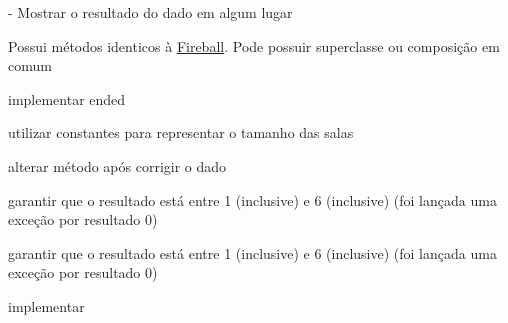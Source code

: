 \begin{DoxyRefList}
-\/ Mostrar o resultado do dado em algum lugar  
\item[Classe \mbox{\hyperlink{classbr_1_1unicamp_1_1mc322_1_1projeto_1_1heroquest_1_1magic_1_1_magic_missile}{br.unicamp.mc322.projeto.heroquest.magic.Magic\+Missile}} ]\label{todo__todo000063}%
%
Possui métodos identicos à \mbox{\hyperlink{classbr_1_1unicamp_1_1mc322_1_1projeto_1_1heroquest_1_1magic_1_1_fireball}{Fireball}}. Pode possuir superclasse ou composição em comum  
\item[Classe \mbox{\hyperlink{classbr_1_1unicamp_1_1mc322_1_1projeto_1_1heroquest_1_1service_1_1_hero_quest_stage_creator_service}{br.unicamp.mc322.projeto.heroquest.service.Hero\+Quest\+Stage\+Creator\+Service}} ]\label{todo__todo000064}%
%
implementar ended  
\item[Membro \mbox{\hyperlink{classbr_1_1unicamp_1_1mc322_1_1projeto_1_1heroquest_1_1service_1_1_hero_quest_stage_creator_service_a0c08c114512c97cbe75cc9a026592bd2}{br.unicamp.mc322.projeto.heroquest.service.Hero\+Quest\+Stage\+Creator\+Service.add\+Wall}} (Stage\+Prototype stage)]\label{todo__todo000065}%
%
utilizar constantes para representar o tamanho das salas  
\item[Membro \mbox{\hyperlink{classbr_1_1unicamp_1_1mc322_1_1projeto_1_1heroquest_1_1utility_1_1_combat_dice_ac3c738bd38c0f4b3424a3c3b9afe1518}{br.unicamp.mc322.projeto.heroquest.utility.Combat\+Dice.get\+Result}} ()]\label{todo__todo000066}%
%
alterar método após corrigir o dado  
\item[Membro \mbox{\hyperlink{classbr_1_1unicamp_1_1mc322_1_1projeto_1_1heroquest_1_1utility_1_1_d100_dice_afa7c3adcde8e3bbcc85d0d2390e0c914}{br.unicamp.mc322.projeto.heroquest.utility.D100\+Dice.get\+Result}} ()]\label{todo__todo000067}%
%
garantir que o resultado está entre 1 (inclusive) e 6 (inclusive) (foi lançada uma exceção por resultado 0)  
\item[Membro \mbox{\hyperlink{classbr_1_1unicamp_1_1mc322_1_1projeto_1_1heroquest_1_1utility_1_1_d6_dice_ad3cd0341b5c74480bf655b7f2caf2e4c}{br.unicamp.mc322.projeto.heroquest.utility.D6\+Dice.get\+Result}} ()]\label{todo__todo000068}%
%
garantir que o resultado está entre 1 (inclusive) e 6 (inclusive) (foi lançada uma exceção por resultado 0)  
\item[Membro \mbox{\hyperlink{classbr_1_1unicamp_1_1mc322_1_1projeto_1_1heroquest_1_1utility_1_1_random_pose_af6cbeaa298eb7ab93553d8a1af0a5c60}{br.unicamp.mc322.projeto.heroquest.utility.Random\+Pose.get\+Result}} ()]\label{todo__todo000069}%
%
implementar 
\end{DoxyRefList}